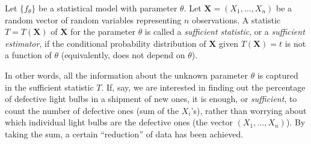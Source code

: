 \documentclass[12pt]{article}
\begin{document}
Let $\lbrace f_\theta \rbrace$ be a statistical model with parameter
$\theta$.  Let $\boldsymbol{X}=(X_1,\ldots,X_n)$ be a random vector
of random variables representing $n$ observations.  A statistic $T=T(\boldsymbol{X})$ of $\boldsymbol{X}$ for the parameter $\theta$ is called a
\emph{sufficient statistic}, or a \emph{sufficient estimator}, if
the conditional probability distribution of $\boldsymbol{X}$ given
$T(\boldsymbol{X})=t$ is not a function of $\theta$ (equivalently,
does not depend on $\theta$).

In other words, all the information about the unknown parameter
$\theta$ is captured in the sufficient statistic $T$.  If, say, we
are interested in finding out the percentage of defective light
bulbs in a shipment of new ones, it is enough, or \emph{sufficient},
to count the number of defective ones (sum of the $X_i$'s), rather
than worrying about which individual light bulbs are the defective
ones (the vector $(X_1,\ldots,X_n)$).  By taking the sum, a certain
``reduction'' of data has been achieved.
\end{document}
